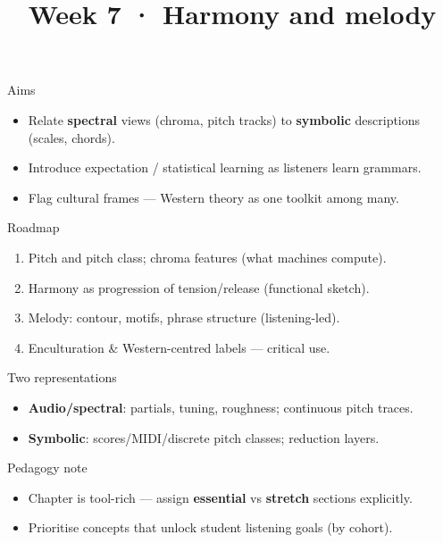 \documentclass[aspectratio=169]{beamer}
\title{Week 7 · Harmony and melody}
\subtitle{\coursename}
\institute{\instituteuo}
\date{}
\begin{document}
\begin{frame}
  \titlepage
\end{frame}

\begin{frame}{Aims}
  \begin{itemize}
    \item Relate \textbf{spectral} views (chroma, pitch tracks) to \textbf{symbolic} descriptions (scales, chords).
    \item Introduce expectation / statistical learning as listeners learn grammars.
    \item Flag cultural frames — Western theory as one toolkit among many.
  \end{itemize}
\end{frame}

\begin{frame}{Roadmap}
  \begin{enumerate}
    \item Pitch and pitch class; chroma features (what machines compute).
    \item Harmony as progression of tension/release (functional sketch).
    \item Melody: contour, motifs, phrase structure (listening-led).
    \item Enculturation \& Western-centred labels — critical use.
  \end{enumerate}
\end{frame}

\begin{frame}{Two representations}
  \begin{itemize}
    \item \textbf{Audio/spectral}: partials, tuning, roughness; continuous pitch traces.
    \item \textbf{Symbolic}: scores/MIDI/discrete pitch classes; reduction layers.
  \end{itemize}
\end{frame}

\begin{frame}{Pedagogy note}
  \begin{itemize}
    \item Chapter is tool-rich — assign \textbf{essential} vs \textbf{stretch} sections explicitly.
    \item Prioritise concepts that unlock student listening goals (by cohort).
  \end{itemize}
\end{frame}
\end{document}
